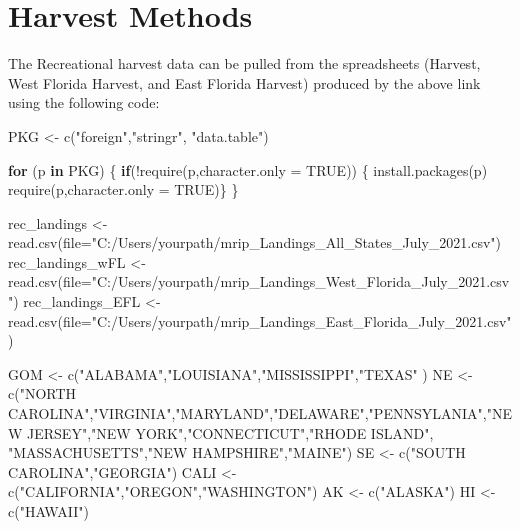 \documentclass[
]{book}
\newenvironment{Shaded}{\begin{snugshade}}{\end{snugshade}}
\newcommand{\AttributeTok}[1]{\textcolor[rgb]{0.77,0.63,0.00}{#1}}
\newcommand{\ConstantTok}[1]{\textcolor[rgb]{0.00,0.00,0.00}{#1}}
\newcommand{\ControlFlowTok}[1]{\textcolor[rgb]{0.13,0.29,0.53}{\textbf{#1}}}
\newcommand{\FunctionTok}[1]{\textcolor[rgb]{0.00,0.00,0.00}{#1}}
\newcommand{\NormalTok}[1]{#1}
\newcommand{\OtherTok}[1]{\textcolor[rgb]{0.56,0.35,0.01}{#1}}
\newcommand{\SpecialCharTok}[1]{\textcolor[rgb]{0.00,0.00,0.00}{#1}}
\newcommand{\StringTok}[1]{\textcolor[rgb]{0.31,0.60,0.02}{#1}}
\begin{document}
\hypertarget{harvest-methods}{%
\section{Harvest Methods}\label{harvest-methods}}

The Recreational harvest data can be pulled from the spreadsheets (Harvest, West Florida Harvest, and East Florida Harvest) produced by the above link using the following code:

\begin{Shaded}
\begin{Highlighting}[]
\NormalTok{PKG }\OtherTok{\textless{}{-}} \FunctionTok{c}\NormalTok{(}\StringTok{"foreign"}\NormalTok{,}\StringTok{"stringr"}\NormalTok{, }\StringTok{"data.table"}\NormalTok{)}

\ControlFlowTok{for}\NormalTok{ (p }\ControlFlowTok{in}\NormalTok{ PKG) \{}
  \ControlFlowTok{if}\NormalTok{(}\SpecialCharTok{!}\FunctionTok{require}\NormalTok{(p,}\AttributeTok{character.only =} \ConstantTok{TRUE}\NormalTok{)) \{}
    \FunctionTok{install.packages}\NormalTok{(p)}
    \FunctionTok{require}\NormalTok{(p,}\AttributeTok{character.only =} \ConstantTok{TRUE}\NormalTok{)\}}
\NormalTok{\}}

\NormalTok{rec\_landings }\OtherTok{\textless{}{-}} \FunctionTok{read.csv}\NormalTok{(}\AttributeTok{file=}\StringTok{"C:/Users/yourpath/mrip\_Landings\_All\_States\_July\_2021.csv"}\NormalTok{)}
\NormalTok{rec\_landings\_wFL }\OtherTok{\textless{}{-}} \FunctionTok{read.csv}\NormalTok{(}\AttributeTok{file=}\StringTok{"C:/Users/yourpath/mrip\_Landings\_West\_Florida\_July\_2021.csv"}\NormalTok{)}
\NormalTok{rec\_landings\_EFL }\OtherTok{\textless{}{-}} \FunctionTok{read.csv}\NormalTok{(}\AttributeTok{file=}\StringTok{"C:/Users/yourpath/mrip\_Landings\_East\_Florida\_July\_2021.csv"}\NormalTok{)}

\NormalTok{GOM }\OtherTok{\textless{}{-}} \FunctionTok{c}\NormalTok{(}\StringTok{"ALABAMA"}\NormalTok{,}\StringTok{"LOUISIANA"}\NormalTok{,}\StringTok{"MISSISSIPPI"}\NormalTok{,}\StringTok{"TEXAS"}\NormalTok{ )}
\NormalTok{NE }\OtherTok{\textless{}{-}} \FunctionTok{c}\NormalTok{(}\StringTok{"NORTH CAROLINA"}\NormalTok{,}\StringTok{"VIRGINIA"}\NormalTok{,}\StringTok{"MARYLAND"}\NormalTok{,}\StringTok{"DELAWARE"}\NormalTok{,}\StringTok{"PENNSYLANIA"}\NormalTok{,}\StringTok{"NEW JERSEY"}\NormalTok{,}\StringTok{"NEW YORK"}\NormalTok{,}\StringTok{"CONNECTICUT"}\NormalTok{,}\StringTok{"RHODE ISLAND"}\NormalTok{,}
        \StringTok{"MASSACHUSETTS"}\NormalTok{,}\StringTok{"NEW HAMPSHIRE"}\NormalTok{,}\StringTok{"MAINE"}\NormalTok{)}
\NormalTok{SE }\OtherTok{\textless{}{-}} \FunctionTok{c}\NormalTok{(}\StringTok{"SOUTH CAROLINA"}\NormalTok{,}\StringTok{"GEORGIA"}\NormalTok{)}
\NormalTok{CALI }\OtherTok{\textless{}{-}} \FunctionTok{c}\NormalTok{(}\StringTok{"CALIFORNIA"}\NormalTok{,}\StringTok{"OREGON"}\NormalTok{,}\StringTok{"WASHINGTON"}\NormalTok{)}
\NormalTok{AK }\OtherTok{\textless{}{-}} \FunctionTok{c}\NormalTok{(}\StringTok{"ALASKA"}\NormalTok{)}
\NormalTok{HI }\OtherTok{\textless{}{-}} \FunctionTok{c}\NormalTok{(}\StringTok{"HAWAII"}\NormalTok{)}


\end{Highlighting}
\end{Shaded}
\end{document}
